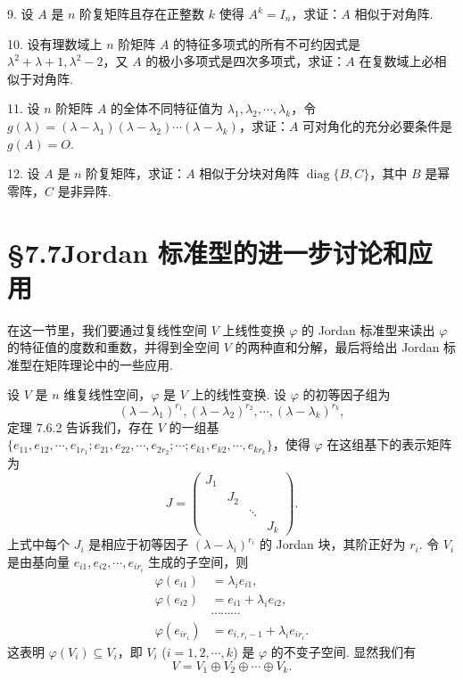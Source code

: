 \documentclass[UTF8,12pt,a4paper,fontset=fandol]{ctexart}
\begin{document}
9. 设 $A$ 是 $n$ 阶复矩阵且存在正整数 $k$ 使得 $A^k=I_n$，求证：$A$ 相似于对角阵.

10. 设有理数域上 $n$ 阶矩阵 $A$ 的特征多项式的所有不可约因式是 $\lambda^2+\lambda+1,\lambda^2-2$，又 $A$ 的极小多项式是四次多项式，求证：$A$ 在复数域上必相似于对角阵.

11. 设 $n$ 阶矩阵 $A$ 的全体不同特征值为 $\lambda_1,\lambda_2,\cdots,\lambda_k$，令 $g(\lambda)=(\lambda-\lambda_1)(\lambda-\lambda_2)\cdots(\lambda-\lambda_k)$，求证：$A$ 可对角化的充分必要条件是 $g(A)=O$.

12. 设 $A$ 是 $n$ 阶复矩阵，求证：$A$ 相似于分块对角阵 $\operatorname{diag}\{B,C\}$，其中 $B$ 是幂零阵，$C$ 是非异阵.

\section*{§7.7\quad Jordan 标准型的进一步讨论和应用}

在这一节里，我们要通过复线性空间 $V$ 上线性变换 $\varphi$ 的 Jordan 标准型来读出 $\varphi$ 的特征值的度数和重数，并得到全空间 $V$ 的两种直和分解，最后将给出 Jordan 标准型在矩阵理论中的一些应用.

设 $V$ 是 $n$ 维复线性空间，$\varphi$ 是 $V$ 上的线性变换. 设 $\varphi$ 的初等因子组为
\begin{equation}
(\lambda-\lambda_1)^{r_1},(\lambda-\lambda_2)^{r_2},\cdots,(\lambda-\lambda_k)^{r_k},
\tag{7.7.1}
\end{equation}
定理 7.6.2 告诉我们，存在 $V$ 的一组基 $\{e_{11},e_{12},\cdots,e_{1r_1};e_{21},e_{22},\cdots,e_{2r_2};\cdots;e_{k1},e_{k2},\cdots,e_{kr_k}\}$，使得 $\varphi$ 在这组基下的表示矩阵为
\[
J=\left(\begin{array}{cccc}
J_1 & & & \\
& J_2 & & \\
& & \ddots & \\
& & & J_k
\end{array}\right).
\]
上式中每个 $J_i$ 是相应于初等因子 $(\lambda-\lambda_i)^{r_i}$ 的 Jordan 块，其阶正好为 $r_i$. 令 $V_i$ 是由基向量 $e_{i1},e_{i2},\cdots,e_{ir_i}$ 生成的子空间，则
\begin{equation}
\begin{aligned}
\varphi(e_{i1})&=\lambda_ie_{i1},\\
\varphi(e_{i2})&=e_{i1}+\lambda_ie_{i2},\\
&\cdots\cdots\cdots\\
\varphi(e_{ir_i})&=e_{i,r_i-1}+\lambda_ie_{ir_i}.
\end{aligned}
\tag{7.7.2}
\end{equation}
这表明 $\varphi(V_i)\subseteq V_i$，即 $V_i$ ($i=1,2,\cdots,k$) 是 $\varphi$ 的不变子空间. 显然我们有
\[
V=V_1\oplus V_2\oplus\cdots\oplus V_k.
\]
\end{document}
